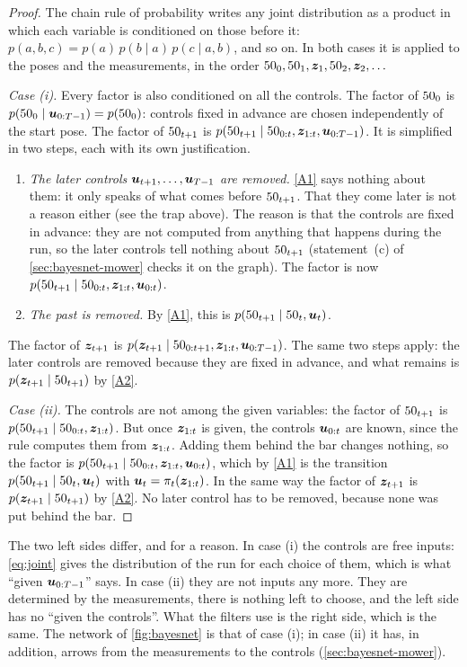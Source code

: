 \begin{proof}
The chain rule of probability writes any joint distribution as a product
in which each variable is conditioned on those before it:
$p(a,b,c)=p(a)\,p(b\mid a)\,p(c\mid a,b)$, and so on. In both cases it is
applied to the poses and the measurements, in the order
$50_0,50_1,\bm{z}_1,50_2,\bm{z}_2,\dots$

\emph{Case (i).} Every factor is also conditioned on all the controls.
The factor of $50_0$ is $p(50_0\mid\bm{u}_{0:T-1})=p(50_0)$: controls fixed
in advance are chosen independently of the start pose. The factor of
$50_{t+1}$ is
$p(50_{t+1}\mid50_{0:t},\bm{z}_{1:t},\bm{u}_{0:T-1})$. It is simplified in two
steps, each with its own justification.
\begin{enumerate}[nosep]
  \item \emph{The later controls $\bm{u}_{t+1},\dots,\bm{u}_{T-1}$ are
    removed.} \ref{A1} says nothing about them: it only speaks of what
    comes before $50_{t+1}$. That they come later is not a reason either
    (see the trap above). The reason is that the controls are fixed in
    advance: they are not computed from anything that happens during the
    run, so the later controls tell nothing about $50_{t+1}$
    (statement~(c) of \cref{sec:bayesnet-mower} checks it on the graph).
    The factor is now $p(50_{t+1}\mid50_{0:t},\bm{z}_{1:t},\bm{u}_{0:t})$.
  \item \emph{The past is removed.} By \ref{A1}, this is
    $p(50_{t+1}\mid50_t,\bm{u}_t)$.
\end{enumerate}
The factor of
$\bm{z}_{t+1}$ is $p(\bm{z}_{t+1}\mid50_{0:t+1},\bm{z}_{1:t},\bm{u}_{0:T-1})$. The same
two steps apply: the later controls are removed because they are fixed in
advance, and what remains is $p(\bm{z}_{t+1}\mid50_{t+1})$ by \ref{A2}.

\emph{Case (ii).} The controls are not among the given variables: the
factor of $50_{t+1}$ is $p(50_{t+1}\mid50_{0:t},\bm{z}_{1:t})$. But once
$\bm{z}_{1:t}$ is given, the controls $\bm{u}_{0:t}$ are known, since the rule
computes them from $\bm{z}_{1:t}$. Adding them behind the bar changes
nothing, so the factor is
$p(50_{t+1}\mid50_{0:t},\bm{z}_{1:t},\bm{u}_{0:t})$, which by \ref{A1} is the
transition $p(50_{t+1}\mid50_t,\bm{u}_t)$ with
$\bm{u}_t=\pi_t(\bm{z}_{1:t})$. In the same way the factor of $\bm{z}_{t+1}$ is
$p(\bm{z}_{t+1}\mid50_{t+1})$ by \ref{A2}. No later control has to be
removed, because none was put behind the bar.
\end{proof}

The two left sides differ, and for a reason. In case (i) the controls are
free inputs: \eqref{eq:joint} gives the distribution of the run for each
choice of them, which is what ``given $\bm{u}_{0:T-1}$'' says. In case (ii)
they are not inputs any more. They are determined by the measurements,
there is nothing left to choose, and the left side has no ``given the
controls''. What the filters use is the right side, which is the same.
The network of \cref{fig:bayesnet} is that of case (i); in case (ii) it
has, in addition, arrows from the measurements to the controls
(\cref{sec:bayesnet-mower}).


